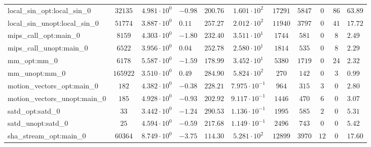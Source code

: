\begin{tabular}{|l|c|HHc|c|c|c|c|cH|}
local\_sin\_opt:local\_sin\_0                   & $ 32135    $ & $ 4.981 \cdot 10^{0} $ & $ -0.98 $ & $ 200.76 $ & $ 1.601 \cdot 10^{2}  $ & $ 17291  $ & $ 5847  $ & $ 0   $ & $ 86  $ & $ 63.89   $ \\
local\_sin\_unopt:local\_sin\_0                 & $ 51774    $ & $ 3.887 \cdot 10^{0} $ & $ 0.11  $ & $ 257.27 $ & $ 2.012 \cdot 10^{2}  $ & $ 11940  $ & $ 3797  $ & $ 0   $ & $ 41  $ & $ 17.72   $ \\
mips\_call\_opt:main\_0                         & $ 8159     $ & $ 4.303 \cdot 10^{0} $ & $ -1.80 $ & $ 232.40 $ & $ 3.511 \cdot 10^{1}  $ & $ 1744   $ & $ 581   $ & $ 0   $ & $ 8   $ & $ 2.49    $ \\
mips\_call\_unopt:main\_0                       & $ 6522     $ & $ 3.956 \cdot 10^{0} $ & $ 0.04  $ & $ 252.78 $ & $ 2.580 \cdot 10^{1}  $ & $ 1814   $ & $ 535   $ & $ 0   $ & $ 8   $ & $ 2.29    $ \\
mm\_opt:mm\_0                                   & $ 6178     $ & $ 5.587 \cdot 10^{0} $ & $ -1.59 $ & $ 178.99 $ & $ 3.452 \cdot 10^{1}  $ & $ 5380   $ & $ 1719  $ & $ 0   $ & $ 24  $ & $ 2.32    $ \\
mm\_unopt:mm\_0                                 & $ 165922   $ & $ 3.510 \cdot 10^{0} $ & $ 0.49  $ & $ 284.90 $ & $ 5.824 \cdot 10^{2}  $ & $ 270    $ & $ 142   $ & $ 0   $ & $ 3   $ & $ 0.99    $ \\
motion\_vectors\_opt:main\_0                    & $ 182      $ & $ 4.382 \cdot 10^{0} $ & $ -0.38 $ & $ 228.21 $ & $ 7.975 \cdot 10^{-1} $ & $ 964    $ & $ 315   $ & $ 3   $ & $ 0   $ & $ 2.80    $ \\
motion\_vectors\_unopt:main\_0                  & $ 185      $ & $ 4.928 \cdot 10^{0} $ & $ -0.93 $ & $ 202.92 $ & $ 9.117 \cdot 10^{-1} $ & $ 1446   $ & $ 470   $ & $ 6   $ & $ 0   $ & $ 3.07    $ \\
satd\_opt:satd\_0                               & $ 33       $ & $ 3.442 \cdot 10^{0} $ & $ -1.24 $ & $ 290.53 $ & $ 1.136 \cdot 10^{-1} $ & $ 1995   $ & $ 585   $ & $ 2   $ & $ 0   $ & $ 5.31    $ \\
satd\_unopt:satd\_0                             & $ 25       $ & $ 4.594 \cdot 10^{0} $ & $ -0.59 $ & $ 217.68 $ & $ 1.149 \cdot 10^{-1} $ & $ 2496   $ & $ 743   $ & $ 0   $ & $ 0   $ & $ 5.42    $ \\
sha\_stream\_opt:main\_0                        & $ 60364    $ & $ 8.749 \cdot 10^{0} $ & $ -3.75 $ & $ 114.30 $ & $ 5.281 \cdot 10^{2}  $ & $ 12899  $ & $ 3970  $ & $ 12  $ & $ 0   $ & $ 17.60   $ \\

\end{tabular}
